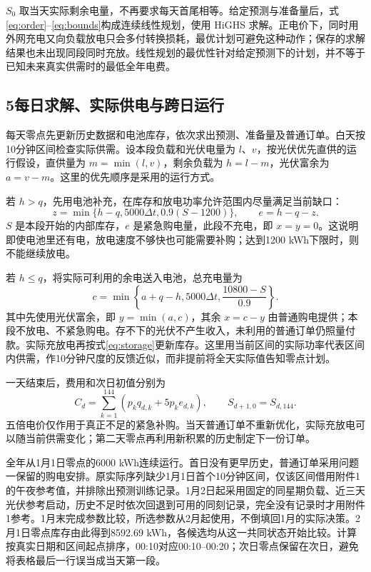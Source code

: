 $S_0$ 取当天实际剩余电量，不再要求每天首尾相等。给定预测与准备量后，式\eqref{eq:order}--\eqref{eq:bounds}构成连续线性规划，使用 HiGHS 求解。正电价下，同时用外网充电又向负载放电只会多付转换损耗，最优计划可避免这种动作；保存的求解结果也未出现同段同时充放。线性规划的最优性针对给定预测下的计划，并不等于已知未来真实供需时的最低全年电费。

\subsection*{5\quad 每日求解、实际供电与跨日运行}

每天零点先更新历史数据和电池库存，依次求出预测、准备量及普通订单。白天按10分钟区间检查实际供需。设本段负载和光伏电量为 $l$、$v$，按光伏优先直供的运行假设，直供量为 $m=\min(l,v)$，剩余负载为 $h=l-m$，光伏富余为 $a=v-m$。这里的优先顺序是采用的运行方式。

若 $h>q$，先用电池补充，在库存和放电功率允许范围内尽量满足当前缺口：
\begin{equation}
z=\min\{h-q,5000\Delta t,0.9(S-1200)\},\qquad e=h-q-z.
\label{eq:emergency}
\end{equation}
$S$ 是本段开始的内部库存，$e$ 是紧急购电量，此段不充电，即 $x=y=0$。这说明即使电池里还有电，放电速度不够快也可能需要补购；达到1200 kWh下限时，则不能继续放电。

若 $h\le q$，将实际可利用的余电送入电池，总充电量为
\begin{equation}
c=\min\left\{a+q-h,5000\Delta t,\frac{10800-S}{0.9}\right\}.
\end{equation}
其中先使用光伏富余，即 $y=\min(a,c)$，其余 $x=c-y$ 由普通购电提供；本段不放电、不紧急购电。存不下的光伏不产生收入，未利用的普通订单仍照量付款。实际充放电再按式\eqref{eq:storage}更新库存。这里用当前区间的实际功率代表区间内供需，作10分钟尺度的反馈近似，而非提前将全天实际值告知零点计划。

一天结束后，费用和次日初值分别为
\begin{equation}
C_d=\sum_{k=1}^{144}\left(p_kq_{d,k}+5p_ke_{d,k}\right),\qquad
S_{d+1,0}=S_{d,144}.
\label{eq:bill}
\end{equation}
五倍电价仅作用于真正不足的紧急补购。当天普通订单不重新优化，实际充放电可以随当前供需变化；第二天零点再利用新积累的历史制定下一份订单。

全年从1月1日零点的6000 kWh连续运行。首日没有更早历史，普通订单采用问题一保留的购电安排。原实际序列缺少1月1日首个10分钟区间，仅该区间借用附件1的午夜参考值，并排除出预测训练记录。1月2日起采用固定的同星期负载、近三天光伏参考启动，历史不足时依次回退到可用的同刻记录，完全没有记录时才用附件1参考。1月末完成参数比较，所选参数从2月起使用，不倒填回1月的实际决策。2月1日零点库存由此得到8592.69 kWh，各候选均从这一共同状态开始比较。计算按真实日期和区间起点排序，00:10对应00:10--00:20；次日零点保留在次日，避免将表格最后一行误当成当天第一段。

